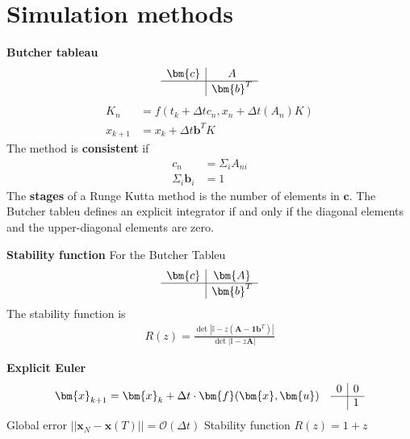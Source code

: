 \section{Simulation methods}

\textbf{Butcher tableau}
\begin{align*}
\begin{array}{c|c}
    \bm{c} & A  \\ \hline
     & \bm{b}^T
\end{array}
\end{align*}
\begin{align*}
    K_n &= f(t_k+\Delta t c_n,x_n + \Delta t (A_n)K) \\
    x_{k+1} &= x_k + \Delta t\bm{b}^TK
\end{align*}
The method is \textbf{consistent} if
\begin{align*}
    c_n &= \Sigma_{i}A_{ni} \\
    \Sigma_i \bm{b}_i &= 1
\end{align*}
The \textbf{stages} of a Runge Kutta method is the number of elements in \(\bm{c}\).
The Butcher tableu defines an explicit integrator if and only if the diagonal
elements and the upper-diagonal elements are zero.
\newline

\textbf{Stability function}
For the Butcher Tableu
\begin{align*}
\begin{array}{c|c}
    \bm{c} & \bm{A}  \\ \hline
     & \bm{b}^T
\end{array}
\end{align*}
The stability function is
\begin{align*}
    R(z) = \frac{\det|\mathbb{I}-z(\bm{A}-\bm{1}\bm{b}^T)|}{\det|\mathbb{I}-z\bm{A}|}
\end{align*}

\textbf{Explicit Euler}
\begin{align*}
    &\bm{x}_{k+1} = \bm{x}_k + \Delta t \cdot \bm{f}(\bm{x},\bm{u}) 
    &\begin{array}{c|c}
         0 & 0 \\ \hline
          & 1
    \end{array}
\end{align*}
Global error \(||\bm{x}_N-\bm{x}(T)|| = \mathcal{O}(\Delta t)\)
\newline
Stability function \(R(z) = 1+z\)
\newline

